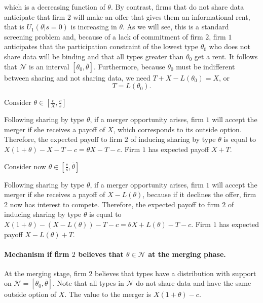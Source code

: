 \documentclass[a4paper]{article}
\newcommand{\N}{\mathcal N}
\renewcommand{\t}{\theta}
\begin{document}
%

which is a decreasing function of $\t$. By contrast, firms that do not share data anticipate that firm $2$ will make an offer that gives them an informational rent, that is $U_1(\t|s=0)$ is increasing in $\t$. As we will see, this is a standard screening problem and, because of a lack of commitment of firm $2$, firm $1$ anticipates that the participation constraint of the lowest type $\t_0$ who does not share data will be binding and that all types greater than $\t_0$ get a rent. It follows that $\N$ is an interval $[\theta_0,\overline \t]$. Furthermore, because $\t_0$ must be indifferent between sharing and not sharing data, we need $T+X-L(\t_0)=X$, or
\begin{equation}\label{eq:T}
  T=L(\t_0).
\end{equation}
%

Consider $\t\in[\frac{c}{X},\frac{c}{s}]$


Following sharing by type $\t$, if a merger opportunity arises, firm $1$ will accept the merger if she receives a payoff of $X$, which corresponds to its outside option. Therefore, the expected payoff to firm $2$ of inducing sharing by type $\t$ is equal to $X(1+\t)-X-T-c=\t X-T-c$. Firm $1$ has expected payoff $X+T$.


Consider now $\t\in[\frac{c}{s},\overline \t]$


Following sharing by type $\t$, if a merger opportunity arises, firm $1$ will accept the merger if she receives a payoff of $X-L(\t)$, because if it declines the offer, firm 2 now has interest to compete. Therefore, the expected payoff to firm $2$ of inducing sharing by type $\t$ is equal to $X(1+\t)-(X-L(\t))-T-c=\t X +L(\t)-T-c$. Firm $1$ has expected payoff $X-L(\t)+T$.


\paragraph{Mechanism if firm $2$ believes that $\t\in\N$ at the merging phase.} At the merging stage, firm $2$ believes that types have a distribution with support on $\N=[\t_0,\overline \t]$. Note that all types in $\N$ do not share data and have the same outside option of $X$. The value to the merger is $X(1+\t)-c$. 
\end{document}
